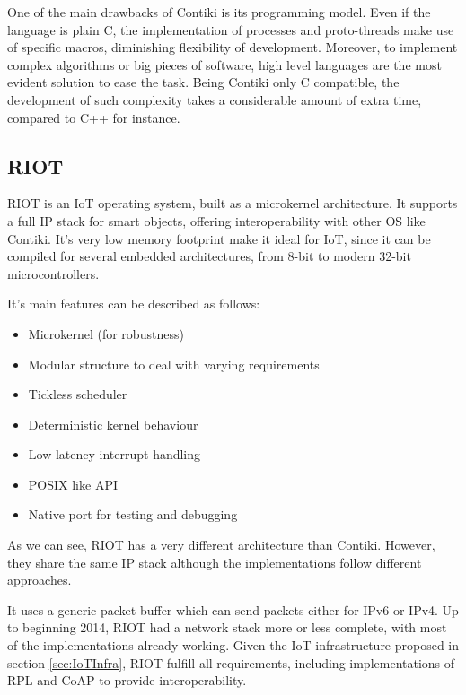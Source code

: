 One of the main drawbacks of Contiki is its programming model.
Even if the language is plain C, the implementation of processes and proto-threads make use of specific macros, diminishing flexibility of development.
Moreover, to implement complex algorithms or big pieces of software, high level languages are the most evident solution to ease the task.
Being Contiki only C compatible, the development of such complexity takes a considerable amount of extra time, compared to C++ for instance.

\subsection{RIOT}
RIOT is an IoT operating system\cite{baccelli2013riot}, built as a microkernel architecture.
It supports a full IP stack for smart objects, offering interoperability with other OS like Contiki.
It's very low memory footprint make it ideal for IoT, since it can be compiled for several embedded architectures, from 8-bit to modern 32-bit microcontrollers.

It's main features can be described as follows:

\begin{itemize}
	\item Microkernel (for robustness)
	\item Modular structure to deal with varying requirements
	\item Tickless scheduler
	\item Deterministic kernel behaviour
	\item Low latency interrupt handling
	\item POSIX like API
	\item Native port for testing and debugging
\end{itemize}

As we can see, RIOT has a very different architecture than Contiki.
However, they share the same IP stack although the implementations follow different approaches.


It uses a generic packet buffer which can send packets either for IPv6 or IPv4.
Up to beginning 2014, RIOT had a network stack more or less complete, with most of the implementations already working.
Given the IoT infrastructure proposed in section \ref{sec:IoTInfra}, RIOT fulfill all requirements, including implementations of RPL and CoAP to provide interoperability.

